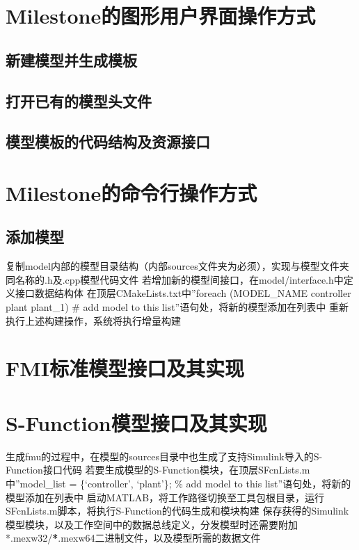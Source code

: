 \documentclass[letterpaper,10pt,english]{sphinxmanual}
\begin{document}
\chapter{Milestone的图形用户界面操作方式}
\label{\detokenize{gui/index:milestone}}\label{\detokenize{gui/index::doc}}

\section{新建模型并生成模板}
\label{\detokenize{gui/_u521b_u5efa_u6a21_u578b:id1}}\label{\detokenize{gui/_u521b_u5efa_u6a21_u578b::doc}}

\section{打开已有的模型头文件}
\label{\detokenize{gui/_u7f16_u8f91_u6a21_u578b:id1}}\label{\detokenize{gui/_u7f16_u8f91_u6a21_u578b::doc}}

\section{模型模板的代码结构及资源接口}
\label{\detokenize{gui/_u4ee3_u7801_u6a21_u677f:id1}}\label{\detokenize{gui/_u4ee3_u7801_u6a21_u677f::doc}}

\chapter{Milestone的命令行操作方式}
\label{\detokenize{cli/index:milestone}}\label{\detokenize{cli/index::doc}}

\section{添加模型}
\label{\detokenize{cli/index:id1}}
复制model内部的模型目录结构（内部sources文件夹为必须），实现与模型文件夹同名称的.h及.cpp模型代码文件
若增加新的模型间接口，在model/interface.h中定义接口数据结构体
在顶层CMakeLists.txt中”foreach (MODEL\_NAME controller plant plant\_1) \# add model to this list”语句处，将新的模型添加在列表中
重新执行上述构建操作，系统将执行增量构建


\chapter{FMI标准模型接口及其实现}
\label{\detokenize{fmi/index:fmi}}\label{\detokenize{fmi/index::doc}}

\chapter{S-Function模型接口及其实现}
\label{\detokenize{sfcn/index:s-function}}\label{\detokenize{sfcn/index::doc}}
生成fmu的过程中，在模型的sources目录中也生成了支持Simulink导入的S-Function接口代码
若要生成模型的S-Function模块，在顶层SFcnLists.m中”model\_list = \{‘controller’, ‘plant’\}; \% add model to this list”语句处，将新的模型添加在列表中
启动MATLAB，将工作路径切换至工具包根目录，运行SFcnLists.m脚本，将执行S-Function的代码生成和模块构建
保存获得的Simulink模型模块，以及工作空间中的数据总线定义，分发模型时还需要附加*.mexw32/{\color{red}\bfseries{}*}.mexw64二进制文件，以及模型所需的数据文件
\end{document}
